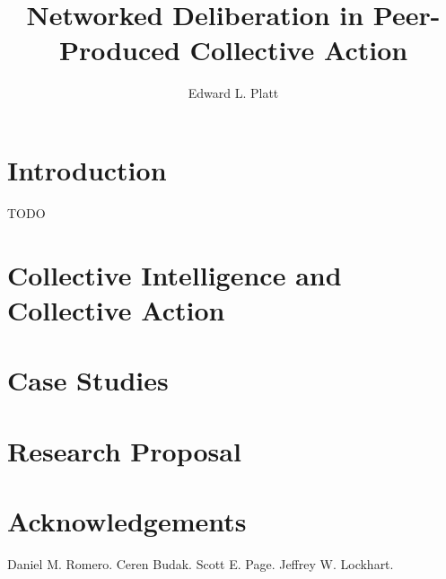 \documentclass{book}
\author{Edward L. Platt}
\title{Networked Deliberation in Peer-Produced Collective Action}
\begin{document}
\maketitle

\chapter{Introduction}
TODO

\chapter{Collective Intelligence and Collective Action}


\chapter{Case Studies}


\chapter{Research Proposal}


\chapter{Acknowledgements}
Daniel M. Romero.
Ceren Budak.
Scott E. Page.
Jeffrey W. Lockhart.



\end{document}
